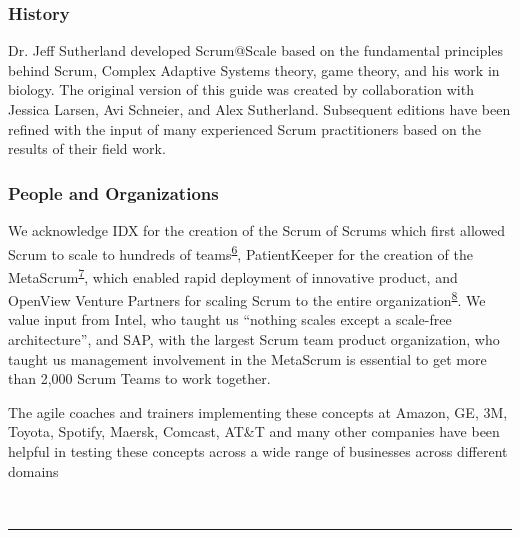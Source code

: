 \documentclass[12pt,a4paper,parskip=full]{scrartcl}
\begin{document}
\subsubsection{History}\label{History}

Dr. Jeff Sutherland developed Scrum@Scale based on the fundamental principles behind Scrum, Complex Adaptive Systems theory, game theory, and his work in biology. The original version of this guide was created by collaboration with Jessica Larsen, Avi Schneier, and Alex Sutherland. Subsequent editions have been refined with the input of many experienced Scrum practitioners based on the results of their field work.

\subsubsection{People and Organizations}\label{People-and-Organizations}

We acknowledge IDX for the creation of the Scrum of Scrums which first
allowed Scrum to scale to hundreds of
teams\textsuperscript{\hyperref[citation6]{6}}, PatientKeeper for the
creation of the MetaScrum\textsuperscript{\hyperref[citation7]{7}},
which enabled rapid deployment of innovative product, and OpenView
Venture Partners for scaling Scrum to the entire
organization\textsuperscript{\hyperref[citation8]{8}}. We value input
from Intel, who taught us ``nothing scales except a scale-free
architecture'', and SAP, with the largest Scrum team product
organization, who taught us management involvement in the MetaScrum is
essential to get more than 2,000 Scrum Teams to work together.

The agile coaches and trainers implementing these concepts at Amazon, GE, 3M, Toyota, Spotify, Maersk, Comcast, AT\&T and many other companies have been helpful in testing these concepts across a wide range of businesses across different domains

~
\pagebreak
\begin{center}\rule{3in}{0.4pt}\end{center}
\end{document}
